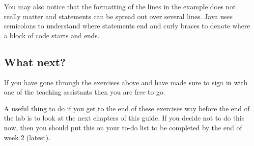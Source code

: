 You may also notice that the formatting of the lines in the example does not really matter and statements can be spread out over several lines. Java uses semicolons to understand where statements end and curly braces to denote where a block of code starts and ends.

\taskLine 


\taskLine 

\subsection{What next?}

If you have gone through the exercises above and have made sure to sign in with one of the teaching assistants then you are free to go.

A useful thing to do if you get to the end of these exercises way before the end of the lab is to look at the next chapters of this guide. If you decide not to do this now, then you should put this on your to-do list to be completed by the end of week 2 (latest).
